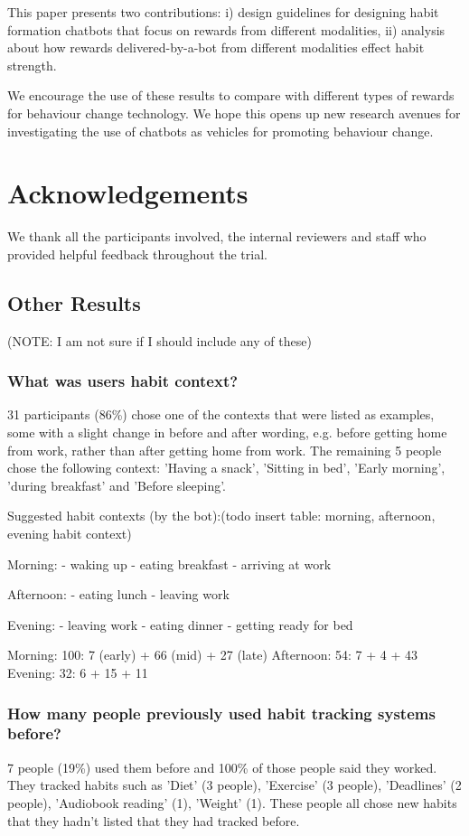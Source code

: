 \documentclass{scaffold/sigchi}
\begin{document}
This paper presents two contributions: i) design guidelines for designing habit formation chatbots that focus on rewards from different modalities, ii) analysis about how rewards delivered-by-a-bot from different modalities effect habit strength.

We encourage the use of these results to compare with different types of rewards for behaviour change technology. We hope this opens up new research avenues for investigating the use of chatbots as vehicles for promoting behaviour change.


\section{Acknowledgements}
We thank all the participants involved, the internal reviewers and staff who provided helpful feedback throughout the trial.


\subsection{Other Results}
(NOTE: I am not sure if I should include any of these)

\subsubsection{What was users habit context?}
31 participants (86\%) chose one of the contexts that were listed as examples, some with a slight change in before and after wording, e.g. before getting home from work, rather than after getting home from work. The remaining 5 people chose the following context: 'Having a snack', 'Sitting in bed', 'Early morning', 'during breakfast' and 'Before sleeping'.

Suggested habit contexts (by the bot):(todo insert table: morning, afternoon, evening habit context)

Morning:
  - waking up
  - eating breakfast
  - arriving at work

  Afternoon:
  - eating lunch
  - leaving work

  Evening:
  - leaving work
  - eating dinner
  - getting ready for bed

  Morning: 100: 7 (early) + 66 (mid) + 27 (late)
  Afternoon: 54: 7 + 4 + 43
  Evening: 32: 6 + 15 + 11


\subsubsection{How many people previously used habit tracking systems before?}
7 people (19\%) used them before and 100\% of those people said they worked. They tracked habits such as 'Diet' (3 people), 'Exercise' (3 people), 'Deadlines' (2 people), 'Audiobook reading' (1), 'Weight' (1). These people all chose new habits that they hadn't listed that they had tracked before.
\end{document}
